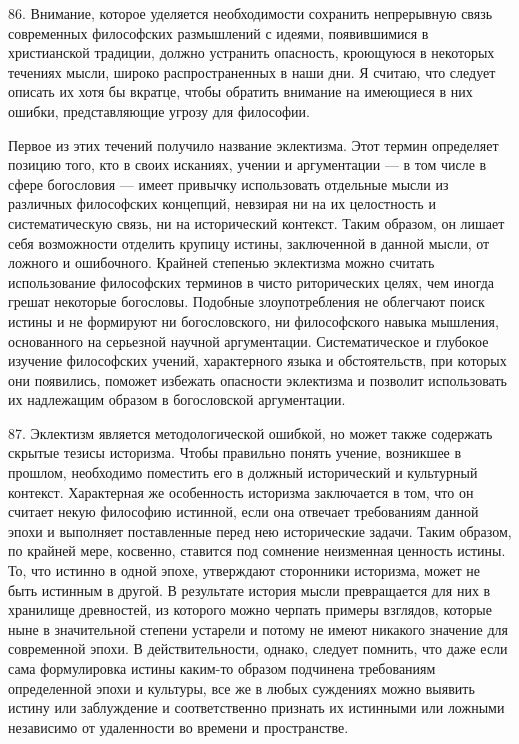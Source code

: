 \documentclass[a5paper,10pt]{article}
\begin{document}
86. Внимание, которое уделяется необходимости сохранить непрерывную связь
современных философских размышлений с идеями, появившимися в христианской
традиции, должно устранить опасность, кроющуюся в некоторых течениях мысли,
широко распространенных в наши дни. Я считаю, что следует описать их хотя бы
вкратце, чтобы обратить внимание на имеющиеся в них ошибки, представляющие
угрозу для философии.

Первое из этих течений получило название эклектизма. Этот термин определяет
позицию того, кто в своих исканиях, учении и аргументации — в том числе в сфере
богословия — имеет привычку использовать отдельные мысли из различных
философских концепций, невзирая ни на их целостность и систематическую связь,
ни на исторический контекст.  Таким образом, он лишает себя возможности
отделить крупицу истины, заключенной в данной мысли, от ложного и ошибочного.
Крайней степенью эклектизма можно считать использование философских терминов в
чисто риторических целях, чем иногда грешат некоторые богословы. Подобные
злоупотребления не облегчают поиск истины и не формируют ни богословского, ни
философского навыка мышления, основанного на серьезной научной аргументации.
Систематическое и глубокое изучение философских учений, характерного языка и
обстоятельств, при которых они появились, поможет избежать опасности эклектизма
и позволит использовать их надлежащим образом в богословской аргументации.

87. Эклектизм является методологической ошибкой, но может также содержать
скрытые тезисы историзма. Чтобы правильно понять учение, возникшее в прошлом,
необходимо поместить его в должный исторический и культурный контекст.
Характерная же особенность историзма заключается в том, что он считает некую
философию истинной, если она отвечает требованиям данной эпохи и выполняет
поставленные перед нею исторические задачи. Таким образом, по крайней мере,
косвенно, ставится под сомнение неизменная ценность истины. То, что истинно в
одной эпохе, утверждают сторонники историзма, может не быть истинным в другой.
В результате история мысли превращается для них в хранилище древностей, из
которого можно черпать примеры взглядов, которые ныне в значительной степени
устарели и потому не имеют никакого значение для современной эпохи. В
действительности, однако, следует помнить, что даже если сама формулировка
истины каким-то образом подчинена требованиям определенной эпохи и культуры,
все же в любых суждениях можно выявить истину или заблуждение и соответственно
признать их истинными или ложными независимо от удаленности во времени и
пространстве.
\end{document}
